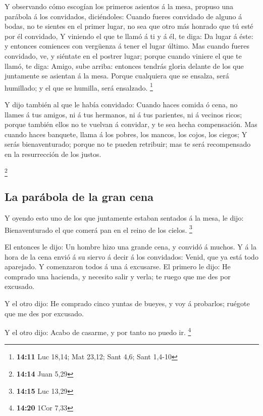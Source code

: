  Y observando cómo escogían los primeros asientos á la
mesa, propuso una parábola á los convidados, diciéndoles: 
Cuando fueres convidado de alguno á bodas, no te sientes en el primer
lugar, no sea que otro más honrado que tú esté por él convidado,
 Y viniendo el que te llamó á ti y á él, te diga: Da lugar
á éste: y entonces comiences con vergüenza á tener el lugar último.
 Mas cuando fueres convidado, ve, y siéntate en el
postrer lugar; porque cuando viniere el que te llamó, te diga: Amigo,
sube arriba: entonces tendrás gloria delante de los que juntamente se
asientan á la mesa.  Porque cualquiera que se ensalza,
será humillado; y el que se humilla, será ensalzado. \footnote{\textbf{14:11}
  Luc 18,14; Mat 23,12; Sant 4,6; Sant 1,4-10}

 Y dijo también al que le había convidado: Cuando haces
comida ó cena, no llames á tus amigos, ni á tus hermanos, ni á tus
parientes, ni á vecinos ricos; porque también ellos no te vuelvan á
convidar, y te sea hecha compensación.  Mas cuando haces
banquete, llama á los pobres, los mancos, los cojos, los ciegos;
 Y serás bienaventurado; porque no te pueden retribuir;
mas te será recompensado en la resurrección de los justos.

\footnote{\textbf{14:14} Juan 5,29}

\hypertarget{la-paruxe1bola-de-la-gran-cena}{%
\subsection{La parábola de la gran
cena}\label{la-paruxe1bola-de-la-gran-cena}}

 Y oyendo esto uno de los que juntamente estaban sentados
á la mesa, le dijo: Bienaventurado el que comerá pan en el reino de los
cielos. \footnote{\textbf{14:15} Luc 13,29}

 El entonces le dijo: Un hombre hizo una grande cena, y
convidó á muchos.  Y á la hora de la cena envió á su
siervo á decir á los convidados: Venid, que ya está todo aparejado.
 Y comenzaron todos á una á excusarse. El primero le
dijo: He comprado una hacienda, y necesito salir y verla; te ruego que
me des por excusado.

 Y el otro dijo: He comprado cinco yuntas de bueyes, y
voy á probarlos; ruégote que me des por excusado.

 Y el otro dijo: Acabo de casarme, y por tanto no puedo
ir. \footnote{\textbf{14:20} 1Cor 7,33}

